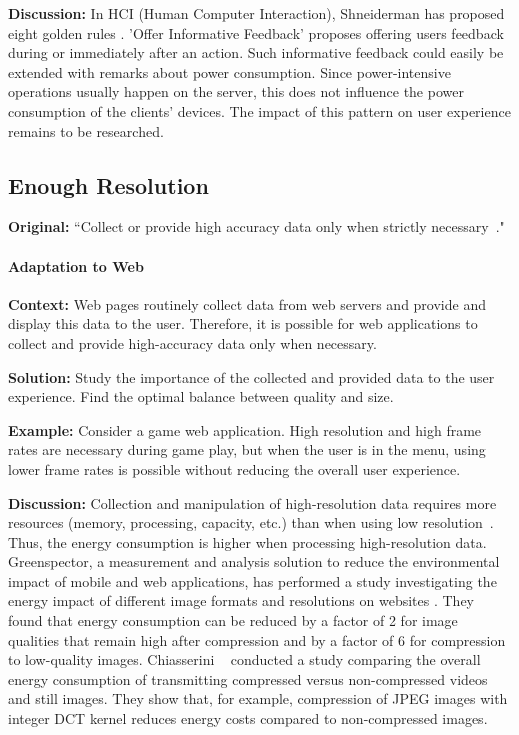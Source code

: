\textbf{Discussion:} In HCI (Human Computer Interaction), Shneiderman has proposed eight golden rules \cite{shneidermans-eight-golden-rules}. 'Offer Informative Feedback' proposes offering users feedback during or immediately after an action. Such informative feedback could easily be extended with remarks about power consumption. Since power-intensive operations usually happen on the server, this does not influence the power consumption of the clients' devices. The impact of this pattern on user experience remains to be researched.


\subsection{Enough Resolution} \label{sec:patterns-EnoughResolution}
\textbf{Original:} ``Collect or provide high accuracy data only when strictly necessary~\cite{cruz2019catalog}."

\paragraph{Adaptation to Web}\mbox{}

\textbf{Context:} Web pages routinely collect data from web servers and provide and display this data to the user. Therefore, it is possible for web applications to collect and provide high-accuracy data only when necessary.

\textbf{Solution:} Study the importance of the collected and provided data to the user experience. Find the optimal balance between quality and size. 

\textbf{Example:} Consider a game web application. High resolution and high frame rates are necessary during game play, but when the user is in the menu, using lower frame rates is possible without reducing the overall user experience.

\textbf{Discussion:} Collection and manipulation of high-resolution data requires more resources (\eg memory, processing, capacity, etc.) than when using low resolution~\cite{cruz2019catalog}. Thus, the energy consumption is higher when processing high-resolution data.
Greenspector, a measurement and analysis solution to reduce the environmental impact of mobile and web applications, has performed a study investigating the energy impact of different image formats and resolutions on websites \cite{energy-consumption-image-format}. They found that energy consumption can be reduced by a factor of 2 for image qualities that remain high after compression and by a factor of 6 for compression to low-quality images. Chiasserini \etal~\cite{Chiasserini2002} conducted a study comparing the overall energy consumption of transmitting compressed versus non-compressed videos and still images. They show that, for example, compression of JPEG images with integer DCT kernel reduces energy costs compared to non-compressed images.

